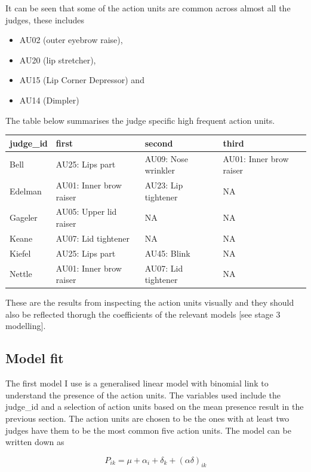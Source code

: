 \documentclass{monashthesis}
\begin{document}
It can be seen that some of the action units are common across almost all the judges, these includes

\begin{itemize}
\tightlist
\item
  AU02 (outer eyebrow raise),
\item
  AU20 (lip stretcher),
\item
  AU15 (Lip Corner Depressor) and
\item
  AU14 (Dimpler)
\end{itemize}

The table below summarises the judge specific high frequent action units.

\begin{tabular}{l|l|l|l}
\hline
judge\_id & first & second & third\\
\hline
Bell & AU25: Lips part & AU09: Nose wrinkler & AU01: Inner brow raiser\\
\hline
Edelman & AU01: Inner brow raiser & AU23: Lip tightener & NA\\
\hline
Gageler & AU05: Upper lid raiser & NA & NA\\
\hline
Keane & AU07: Lid tightener & NA & NA\\
\hline
Kiefel & AU25: Lips part & AU45: Blink & NA\\
\hline
Nettle & AU01: Inner brow raiser & AU07: Lid tightener & NA\\
\hline
\end{tabular}

These are the results from inspecting the action units visually and they should also be reflected thorugh the coefficients of the relevant models {[}see stage 3 modelling{]}.

\hypertarget{model-fit}{%
\subsection{Model fit}\label{model-fit}}

The first model I use is a generalised linear model with binomial link to understand the presence of the action units. The variables used include the judge\_id and a selection of action units based on the mean presence result in the previous section. The action units are chosen to be the ones with at least two judges have them to be the most common five action units. The model can be written down as

\[P_{ik} = \mu + \alpha_i + \delta_k + (\alpha\delta)_{ik}\]
\end{document}
